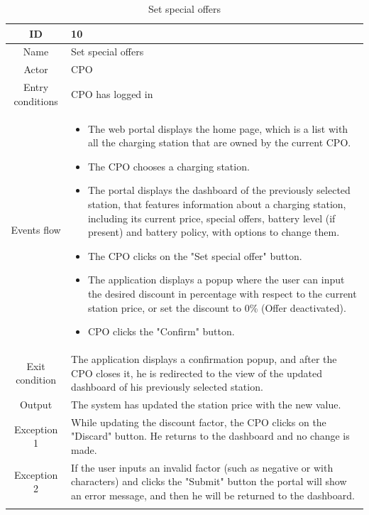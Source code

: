 \begin{longtable}{|c| p{10cm}|}
    \hline ID        & 10\\
    \hline
    Name     & Set special offers\\
    \hline
    Actor            & CPO\\
    \hline
    Entry conditions & CPO has logged in \\
    \hline
    Events flow      & \begin{itemize}[nosep,after=\strut]
        \item The web portal displays the home page, which is a list with all the charging station that are owned by the current CPO.
        \item The CPO chooses a charging station.
        \item The portal displays the dashboard of the previously selected station, that features information about a charging station, including its current price, special offers, battery level (if present) and battery policy, with options to change them.
        \item The CPO clicks on the "Set special offer" button.
        \item The application displays a popup where the user can input the desired discount in percentage with respect to the current station price, or set the discount to 0\% (Offer deactivated).
        \item CPO clicks the "Confirm" button.
    \end{itemize}\\
    \hline
    Exit condition   & The application displays a confirmation popup, and after the CPO closes it, he is redirected to the view of the updated dashboard of his previously selected station.\\
    \hline
    Output           & The system has updated the station price with the new value. 
    \\
    \hline
    \hline
    Exception 1      &  While updating the discount factor, the CPO clicks on the "Discard" button. He returns to the dashboard and no change is made. \\
    \hline
    Exception 2     & If the user inputs an invalid factor (such as negative or with characters) and clicks the "Submit" button the portal will show an error message, and then he will be returned to the dashboard.
    \\
    \hline
    \caption{Set special offers}\\
\end{longtable}
